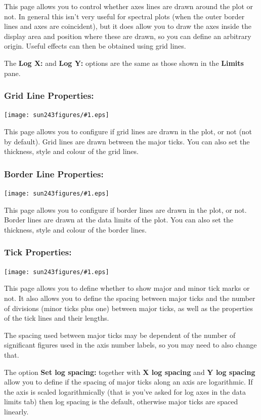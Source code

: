 \documentclass[twoside,11pt]{article}
\newcommand{\htmladdimg}[1]{}
\newcommand{\latexhtml}[2]{#1}
\renewcommand{\_}{\texttt{\symbol{95}}}
\newcommand{\mainfigure}[1]
{\begin{center}
 \latexhtml{\texttt{[image: sun243\_figures/\#1.eps]}}{\htmladdimg{#1.gif}}
 \end{center}
}
\newcommand{\labelitem}[1]{\textbf{#1}}
\begin{document}
This page allows you to control whether axes lines are drawn around the plot
or not. In general this isn't very useful for spectral plots (when the outer
border lines and axes are coincident), but it does allow you to draw the axes
inside the display area and position where these are drawn, so you can define
an arbitrary origin. Useful effects can then be obtained using grid lines.

The \labelitem{Log X:} and \labelitem{Log Y:} options are the same as those
shown in the \labelitem{Limits} pane.

\newpage
\subsubsection*{Grid Line Properties:}

\mainfigure{configurewindowgrid}

This page allows you to configure if grid lines are drawn in the plot,
or not (not by default). Grid lines are drawn between the major
ticks. You can also set the thickness, style and colour of the grid lines.

\newpage
\subsubsection*{Border Line Properties:}

\mainfigure{configurewindowborder}

This page allows you to configure if border lines are drawn in the plot,
or not. Border lines are drawn at the data limits of the plot. You can
also set the thickness, style and colour of the border lines.

\newpage
\subsubsection*{Tick Properties:}

\mainfigure{configurewindowticks}

This page allows you to define whether to show major and minor tick
marks or not. It also allows you to define the spacing between major
ticks and the number of divisions (minor ticks plus one) between major
ticks, as well as the properties of the tick lines and their lengths.

The spacing used between major ticks may be dependent of the number of
significant figures used in the axis number labels, so you may need to
also change that.

The option \labelitem{Set log spacing:} together with
\labelitem{X log spacing} and \labelitem{Y log spacing} allow you to define if
the spacing of major ticks along an axis are logarithmic. If the axis is
scaled logarithmically (that is you've asked for log axes in the data limits
tab) then log spacing is the default, otherwise major ticks are spaced
linearly.
\end{document}
